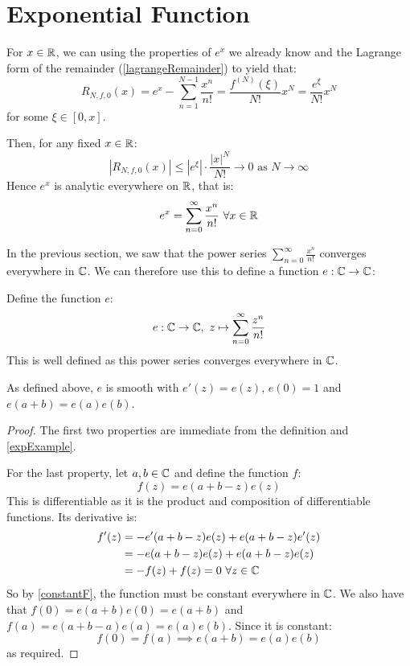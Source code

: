 \documentclass[../main.tex]{subfiles}
\begin{document}
\section{Exponential Function}
\begin{remark}\par
  For $x \in \mathbb{R}$, we can using the properties of $e^{x}$ we already know and the Lagrange form of the remainder (\cref{lagrangeRemainder}) to yield that:
  \[
    R_{N, f, 0}(x) = e^{x} - \sum_{n = 1}^{N - 1} \frac{x^{n}}{n!} = \frac{f^{(N)}(\xi)}{N!}x^{N} = \frac{e^{\xi}}{N!}x^{N}
  \]
  for some $\xi \in [0, x]$.

  Then, for any fixed $x \in \mathbb{R}$:
  \[
    |R_{N, f, 0}(x)| \leq |e^{\xi}|\cdot \frac{|x|^{N}}{N!} \to 0 \text{ as } N \to \infty
  \]
  Hence $e^{x}$ is analytic everywhere on $\mathbb{R}$, that is:
  \[
    e^{x} = \sum_{n = 0}^{\infty} \frac{x^{n}}{n!}\ \forall x \in \mathbb{R}
  \]
\end{remark}
In the previous section, we saw that the power series $\sum_{n = 0}^{\infty} \frac{x^{n}}{n!}$ converges everywhere in $\mathbb{C}$.
We can therefore use this to define a function $e: \mathbb{C} \to \mathbb{C}$:
\begin{definition}
  Define the function $e$:
  \[
    e: \mathbb{C} \to \mathbb{C},\ z \mapsto \sum_{n = 0}^{\infty} \frac{z^{n}}{n!}
  \]
  This is well defined as this power series converges everywhere in $\mathbb{C}$.
\end{definition}
\begin{lemma}
  As defined above, $e$ is smooth with $e'(z) = e(z)$, $e(0) = 1$ and $e(a + b) = e(a)e(b)$.
\end{lemma}
\begin{proof}
  The first two properties are immediate from the definition and \cref{expExample}.

  For the last property, let $a, b \in \mathbb{C}$ and define the function $f$:
  \[
    f(z) = e(a + b - z)e(z)
  \]
  This is differentiable as it is the product and composition of differentiable functions.
  Its derivative is:
  \begin{align*}
    f'(z) &= -e'(a + b - z)e(z) + e(a + b - z)e'(z) \\
          &= -e(a + b - z)e(z) + e(a + b - z)e(z) \\
          &= -f(z) + f(z) = 0\ \forall z \in \mathbb{C}
  \end{align*}
  So by \cref{constantF}, the function must be constant everywhere in $\mathbb{C}$.
  We also have that $f(0) = e(a + b)e(0) = e(a + b)$ and $f(a) = e(a + b - a)e(a) = e(a)e(b)$.
  Since it is constant:
  \[
    f(0) = f(a) \implies e(a + b) = e(a)e(b)
  \]
  as required.
\end{proof}
\end{document}
